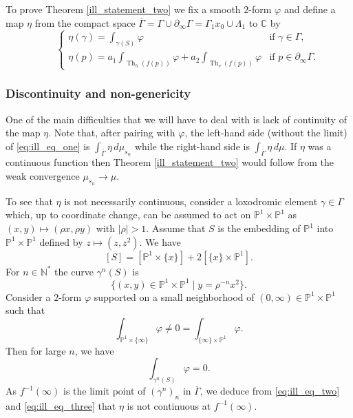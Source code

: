 \documentclass[12pt]{amsbook}%
\theoremstyle{definition}
\theoremstyle{remark}
\numberwithin{section}{chapter}
\numberwithin{subsection}{section}
\numberwithin{figure}{chapter}
\DeclareMathOperator{\Th}{Th}
\def\bC{{\mathbb{C}}}
\def\bP{{\mathbb{P}}}
\def\bN{{\mathbb{N}}}
\def\ga{\gamma}
\def\La{\Lambda}
\def\geo{\partial_\infty}
\begin{document}
{{To prove Theorem \ref{ill_statement_two} we fix a smooth $2$-form $\varphi$ and define a map $\eta$ from the compact space 
$\overline{\Gamma}=\Gamma\cup \geo \Gamma= \Gamma _1 x_0 \cup \La_1$ to $\bC$ by
\begin{equation*}
\phantom{\eta=}  
    \begin{cases}
      \eta(\gamma)=\int_{\ga(S)}\varphi & \text{if $\ga\in \Gamma$},\\
      \eta(p)=a_1\int_{\Th_h(f(p))}\varphi +a_2\int_{\Th_v(f(p))}\varphi & \text{if $p\in \geo\Gamma$}.
    \end{cases}       
\end{equation*}


\subsubsection{Discontinuity and non-genericity}\label{sec:flawedproof}


One of the main difficulties that we will have to deal with is lack of continuity of the map $\eta$. Note that, after pairing with $\varphi$, the left-hand side (without the limit) of \eqref{eq:ill_eq_one} is $\int_{\overline{\Gamma}}\eta\, d\mu_{s_n}$ while the right-hand side is $\int_{\overline{\Gamma}}\eta \, d\mu$. 
If $\eta$ was a continuous function then Theorem \ref{ill_statement_two} would follow from the weak convergence $\mu_{s_n}\rightarrow \mu$.  

To see that $\eta$ is not necessarily continuous, consider a loxodromic element  $\gamma\in \Gamma$ which, up to coordinate change, can be assumed to act on $\bP^1\times \bP^1$ as $(x,y)\mapsto (\rho x, \rho y)$ with $|\rho|>1$. Assume that $S$ is the embedding of $\bP^1$ into $\bP^1\times \bP^1$ defined by $z\mapsto(z,z^2)$. We have 
\[[S]=[\bP^1\times \{x\}]+2[\{x\}\times \bP^1].\]
For $n\in \bN^*$ the curve $\ga^n(S)$ is 
\[
\{(x,y)\in \bP^1\times \bP^1\mid y=\rho^{-n}x^2\}.
\]
Consider a $2$-form $\varphi$ supported on a small neighborhood of $(0,\infty)\in \bP^1\times \bP^1$ such that 
\begin{equation}\label{eq:ill_eq_two}
\int_{\bP^1\times \{\infty\}}\varphi\neq 0=\int_{\{\infty\}\times \bP^1}\varphi.
\end{equation}
Then for large $n$, we have
\begin{equation}
\label{eq:ill_eq_three}
\int_{\ga^n(S)}\varphi=0.
\end{equation}
As $f^{-1}(\infty)$ is the limit point of $(\ga^n)_n$ in $\overline{\Gamma}$, we deduce from \eqref{eq:ill_eq_two} and \eqref{eq:ill_eq_three} that $\eta$ is not continuous at $f^{-1}(\infty)$.

}}
\end{document}
